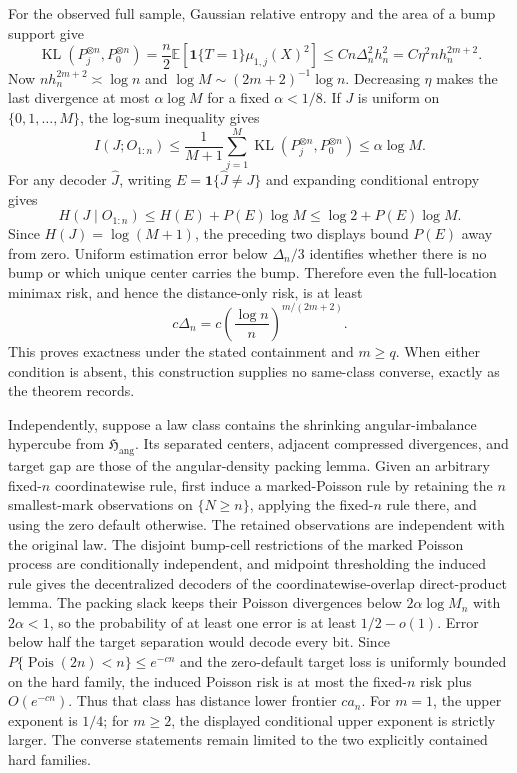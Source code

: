For the observed full sample, Gaussian relative entropy and the area of a bump support give
\[
 \operatorname{KL}(P_j^{\otimes n},P_0^{\otimes n})
 =\frac n2\mathbb E\!\left[
 \mathbf1\{T=1\}\mu_{1,j}(X)^2\right]
 \leq Cn\Delta_n^2h_n^2
 =C\eta^2nh_n^{2m+2}.
\]
Now \(nh_n^{2m+2}\asymp\log n\) and \(\log M\sim(2m+2)^{-1}\log n\).  Decreasing \(\eta\) makes the last divergence at most \(\alpha\log M\) for a fixed \(\alpha<1/8\).  If \(J\) is uniform on \(\{0,1,\ldots,M\}\), the log-sum inequality gives
\[
 I(J;O_{1:n})
 \leq\frac1{M+1}\sum_{j=1}^M
 \operatorname{KL}(P_j^{\otimes n},P_0^{\otimes n})
 \leq\alpha\log M.
\]
For any decoder \(\widehat J\), writing \(E=\mathbf1\{\widehat J\neq J\}\) and expanding conditional entropy gives
\[
 H(J\mid O_{1:n})\leq H(E)+P(E)\log M
 \leq\log2+P(E)\log M.
\]
Since \(H(J)=\log(M+1)\), the preceding two displays bound \(P(E)\) away from zero.  Uniform estimation error below \(\Delta_n/3\) identifies whether there is no bump or which unique center carries the bump.  Therefore even the full-location minimax risk, and hence the distance-only risk, is at least
\[
 c\Delta_n
 =c\left(\frac{\log n}{n}\right)^{m/(2m+2)}.
\]
This proves exactness under the stated containment and \(m\geq q\).  When either condition is absent, this construction supplies no same-class converse, exactly as the theorem records.

Independently, suppose a law class contains the shrinking angular-imbalance hypercube from \(\mathfrak H_{\mathrm{ang}}\).  Its separated centers, adjacent compressed divergences, and target gap are those of the angular-density packing lemma.  Given an arbitrary fixed-\(n\) coordinatewise rule, first induce a marked-Poisson rule by retaining the \(n\) smallest-mark observations on \(\{N\geq n\}\), applying the fixed-\(n\) rule there, and using the zero default otherwise.  The retained observations are independent with the original law.  The disjoint bump-cell restrictions of the marked Poisson process are conditionally independent, and midpoint thresholding the induced rule gives the decentralized decoders of the coordinatewise-overlap direct-product lemma.  The packing slack keeps their Poisson divergences below \(2\alpha\log M_n\) with \(2\alpha<1\), so the probability of at least one error is at least \(1/2-o(1)\).  Error below half the target separation would decode every bit.  Since \(P\{\operatorname{Pois}(2n)<n\}\leq e^{-cn}\) and the zero-default target loss is uniformly bounded on the hard family, the induced Poisson risk is at most the fixed-\(n\) risk plus \(O(e^{-cn})\).  Thus that class has distance lower frontier \(ca_n\).  For \(m=1\), the upper exponent is \(1/4\); for \(m\geq2\), the displayed conditional upper exponent is strictly larger.  The converse statements remain limited to the two explicitly contained hard families.

